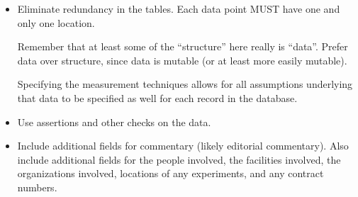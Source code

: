 \begin{itemize}
\begin{enumerate}
    \end{enumerate}

\item Eliminate redundancy in the tables.  Each data point MUST have one and
only one location.

Remember that at least some of the ``structure'' here really is ``data''.
Prefer data over structure, since data is mutable (or at least more easily
mutable).

Specifying the measurement techniques allows for all assumptions underlying
that data to be specified as well for each record in the database.

\item

Use assertions and other checks on the data.

\item

Include additional fields for commentary (likely editorial commentary).  Also
include additional fields for the people involved, the facilities involved, the
organizations involved, locations of any experiments, and any contract numbers.

\end{itemize}
